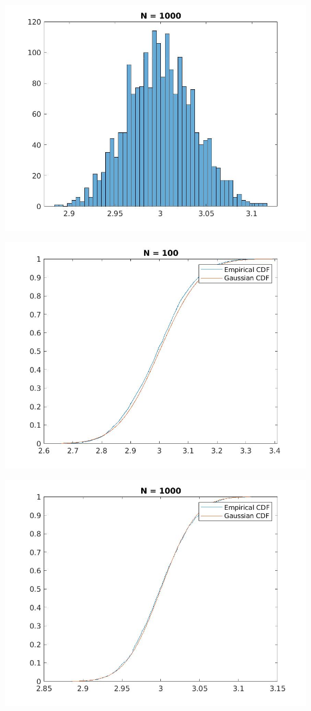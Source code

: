 \documentclass{article}
\theoremstyle{remark}
\begin{document}
\includegraphics[width=\textwidth, height=\textheight, keepaspectratio]{p1_1000.jpg}\par
\includegraphics[width=\textwidth, height=\textheight, keepaspectratio]{p2_100.jpg}\par
\includegraphics[width=\textwidth, height=\textheight, keepaspectratio]{p2_1000.jpg}\par
\end{document}
